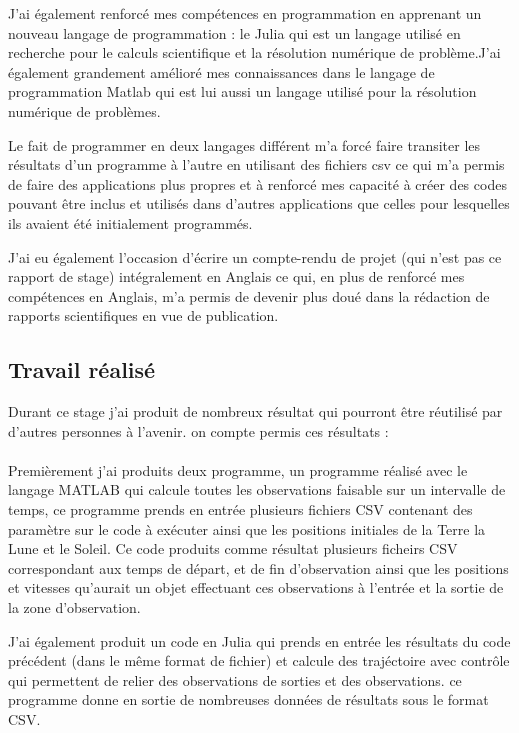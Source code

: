 \documentclass[12pt]{article} %
\begin{document}
		J'ai également renforcé mes compétences en programmation en apprenant un nouveau langage de programmation : le Julia qui est un langage utilisé en recherche pour le calculs scientifique et la résolution numérique de problème.J'ai également grandement amélioré mes connaissances dans le langage de programmation Matlab qui est lui aussi un langage utilisé pour la résolution numérique de problèmes.
		
		Le fait de programmer en deux langages différent m'a forcé faire transiter les résultats d'un programme à l'autre en utilisant des fichiers csv ce qui m'a permis de faire des applications plus propres et à renforcé mes capacité à créer des codes pouvant être inclus et utilisés dans d'autres applications que celles pour lesquelles ils avaient été initialement programmés.
		
		J'ai eu également l'occasion d'écrire un compte-rendu de projet (qui n'est pas ce rapport de stage) intégralement en Anglais ce qui, en plus de renforcé mes compétences en Anglais, m'a permis de devenir plus doué dans la rédaction de rapports scientifiques en vue de publication.
		
		\subsection{Travail réalisé}
		
		Durant ce stage j'ai produit de nombreux résultat qui pourront être réutilisé par d'autres personnes à l'avenir. on compte permis ces résultats : 
		\\ \\
		Premièrement j'ai produits deux programme, un programme réalisé avec le langage MATLAB qui calcule toutes les observations faisable sur un intervalle de temps, ce programme prends en entrée plusieurs fichiers CSV contenant des paramètre sur le code à exécuter ainsi que les positions initiales de la Terre la Lune et le Soleil. Ce code produits comme résultat plusieurs ficheirs CSV correspondant aux temps de départ, et de fin d'observation ainsi que les positions et vitesses qu'aurait un objet effectuant ces observations à l'entrée et la sortie de la zone d'observation.
		
		J'ai également produit un code en Julia qui prends en entrée les résultats du code précédent (dans le même format de fichier) et calcule des trajéctoire avec contrôle qui permettent de relier des observations de sorties et des observations. ce programme donne en sortie de nombreuses données de résultats sous le format CSV.
		
\end{document}
